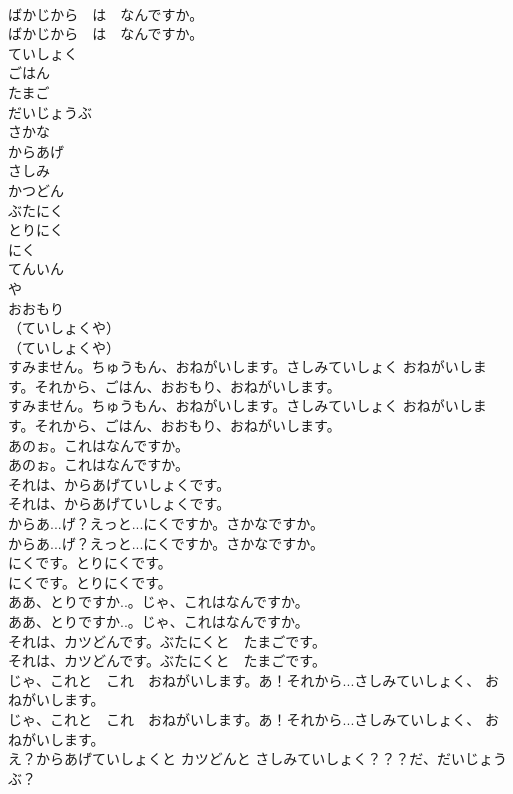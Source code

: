 \documentclass[8pt]{extreport}
\begin{document}
\begin{CJK}{UTF8}{min}
\\	ばかじから　は　なんですか。	
\\	ばかじから　は　なんですか。 
\\	ていしょく
\\	ごはん
\\	たまご
\\	だいじょうぶ
\\	さかな
\\	からあげ
\\	さしみ
\\	かつどん
\\	ぶたにく
\\	とりにく
\\	にく
\\	てんいん
\\	や
\\	おおもり
\\	（ていしょくや）	
\\	（ていしょくや） 
\\	すみません。ちゅうもん、おねがいします。さしみていしょく おねがいします。それから、ごはん、おおもり、おねがいします。	
\\	すみません。ちゅうもん、おねがいします。さしみていしょく おねがいします。それから、ごはん、おおもり、おねがいします。 
\\	あのぉ。これはなんですか。	
\\	あのぉ。これはなんですか。 
\\	それは、からあげていしょくです。	
\\	それは、からあげていしょくです。 
\\	からあ...げ？えっと...にくですか。さかなですか。	
\\	からあ...げ？えっと...にくですか。さかなですか。 
\\	にくです。とりにくです。	
\\	にくです。とりにくです。 
\\	ああ、とりですか..。じゃ、これはなんですか。	
\\	ああ、とりですか..。じゃ、これはなんですか。 
\\	それは、カツどんです。ぶたにくと　たまごです。	
\\	それは、カツどんです。ぶたにくと　たまごです。 
\\	じゃ、これと　これ　おねがいします。あ！それから...さしみていしょく、 おねがいします。	
\\	じゃ、これと　これ　おねがいします。あ！それから...さしみていしょく、 おねがいします。 
\\	え？からあげていしょくと カツどんと さしみていしょく？？？だ、だいじょうぶ？	

\end{CJK}
\end{document}

